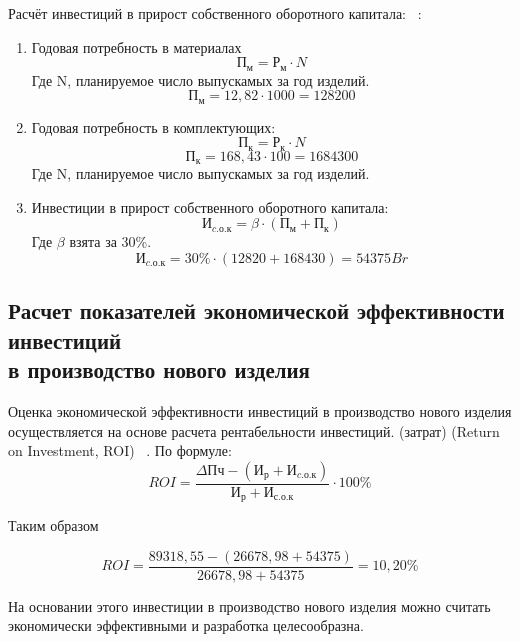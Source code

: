Расчёт инвестиций в прирост собственного оборотного капитала:
~\cite{bsuir-project-economics}:
\begin{enumerate}
\item Годовая потребность в материалах
  \begin{equation}
    П_м = Р_м \cdot N
  \end{equation}
Где N, планируемое число выпускамых за год изделий.
  $$  П_м = 12,82 \cdot 1000 = 128200$$
\item Годовая потребность в комплектующих:
  \begin{equation}
    П_к = Р_к \cdot N
  \end{equation}
  $$П_к = 168,43 \cdot 100 = 1684300$$
Где N, планируемое число выпускамых за год изделий.

\item Инвестиции в прирост собственного оборотного капитала:
\begin{equation}
  И_{c.о.к} = \beta \cdot (П_м + П_к)
\end{equation}
Где $\beta$ взята за 30\%.
$$   И_{c.о.к} = 30\% \cdot (12820 + 168430) = 54375Br$$
\end{enumerate}

\subsection{Расчет показателей экономической эффективности инвестиций \\
  в производство нового изделия}
 Оценка экономической эффективности инвестиций в производство нового
изделия осуществляется на основе расчета рентабельности инвестиций.
(затрат) (Return on Investment, ROI) ~\cite{bsuir-project-economics}.
По формуле:
\begin{equation}
  ROI= \frac{\Delta Пч - (И_р + И_{c.о.к})}{И_р + И_{с.о.к}} \cdot 100 \%
\end{equation}

Таким образом

$$ROI=\frac{89 318,55 - (26678,98 + 54375)}{26678,98 + 54375}= 10,20\%$$


На основании этого инвестиции в производство нового изделия можно
считать экономически эффективными и разработка целесообразна.

\newpage

